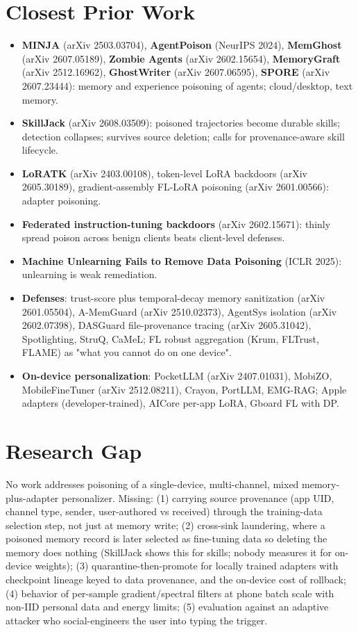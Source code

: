 \documentclass[11pt]{article}
\begin{document}
\section{Closest Prior Work}
\begin{itemize}
  \item \textbf{MINJA} (arXiv 2503.03704), \textbf{AgentPoison} (NeurIPS 2024), \textbf{MemGhost} (arXiv 2607.05189), \textbf{Zombie Agents} (arXiv 2602.15654), \textbf{MemoryGraft} (arXiv 2512.16962), \textbf{GhostWriter} (arXiv 2607.06595), \textbf{SPORE} (arXiv 2607.23444): memory and experience poisoning of agents; cloud/desktop, text memory.
  \item \textbf{SkillJack} (arXiv 2608.03509): poisoned trajectories become durable skills; detection collapses; survives source deletion; calls for provenance-aware skill lifecycle.
  \item \textbf{LoRATK} (arXiv 2403.00108), token-level LoRA backdoors (arXiv 2605.30189), gradient-assembly FL-LoRA poisoning (arXiv 2601.00566): adapter poisoning.
  \item \textbf{Federated instruction-tuning backdoors} (arXiv 2602.15671): thinly spread poison across benign clients beats client-level defenses.
  \item \textbf{Machine Unlearning Fails to Remove Data Poisoning} (ICLR 2025): unlearning is weak remediation.
  \item \textbf{Defenses}: trust-score plus temporal-decay memory sanitization (arXiv 2601.05504), A-MemGuard (arXiv 2510.02373), AgentSys isolation (arXiv 2602.07398), DASGuard file-provenance tracing (arXiv 2605.31042), Spotlighting, StruQ, CaMeL; FL robust aggregation (Krum, FLTrust, FLAME) as "what you cannot do on one device".
  \item \textbf{On-device personalization}: PocketLLM (arXiv 2407.01031), MobiZO, MobileFineTuner (arXiv 2512.08211), Crayon, PortLLM, EMG-RAG; Apple adapters (developer-trained), AICore per-app LoRA, Gboard FL with DP.
\end{itemize}

\section{Research Gap}
No work addresses poisoning of a single-device, multi-channel, mixed memory-plus-adapter personalizer. Missing: (1) carrying source provenance (app UID, channel type, sender, user-authored vs received) through the training-data selection step, not just at memory write; (2) cross-sink laundering, where a poisoned memory record is later selected as fine-tuning data so deleting the memory does nothing (SkillJack shows this for skills; nobody measures it for on-device weights); (3) quarantine-then-promote for locally trained adapters with checkpoint lineage keyed to data provenance, and the on-device cost of rollback; (4) behavior of per-sample gradient/spectral filters at phone batch scale with non-IID personal data and energy limits; (5) evaluation against an adaptive attacker who social-engineers the user into typing the trigger.
\end{document}
